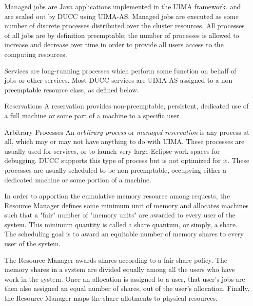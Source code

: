     \begin{description}
        \item[Managed Jobs]
            Managed jobs are Java applications implemented in the UIMA framework. 
            and are scaled out by DUCC using UIMA-AS. Managed jobs are executed as some 
            number of discrete processes distributed over the cluster resources. All processes of all jobs 
            are by definition preemptable; the number of processes is allowed to increase and decrease 
            over time in order to provide all users access to the computing resources. 
        \item[Services]
            Services are long-running processes which perform some function on behalf of 
            jobs or other services. Most DUCC services are UIMA-AS assigned to a non-preemptable 
            resource class, as defined below.

        \item{Reservations}
            A reservation provides non-preemptable, persistent, dedicated use of a full machine or
            some part of a machine to a specific user.

        \item{Arbitrary Processes}
            An {\em arbitrary process} or {\em managed reservation} is any process at all, which may
            or may not have anything to do with UIMA.  These processes are usually used for services,
            or to launch very large Eclipse work-spaces for debugging.  DUCC supports this type of 
            process but is not optimized for it.  These processes are usually scheduled to be 
            non-preemptable, occupying either a dedicated machine or some portion of a machine.

      \end{description}
          
    In order to apportion the cumulative memory resource among requests, the Resource Manager 
    defines some minimum unit of memory and allocates machines such that a "fair" number of 
    "memory units" are awarded to every user of the system. This minimum quantity is called a share 
    quantum, or simply, a share. The scheduling goal is to award an equitable number of memory 
    shares to every user of the system. 

    The Resource Manager awards shares according to a fair share policy. The memory shares in a 
    system are divided equally among all the users who have work in the system. Once an allocation 
    is assigned to a user, that user's jobs are then also assigned an equal number of shares, out of the 
    user's allocation. Finally, the Resource Manager maps the share allotments to physical resources. 
    
